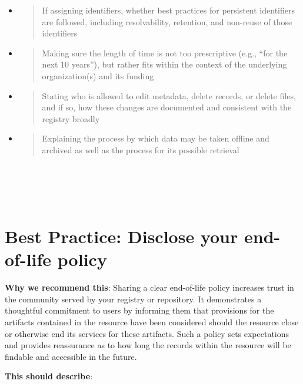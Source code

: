 \documentclass[]{article}
\begin{document}
\begin{itemize}
\item
  \begin{quote}
  If assigning identifiers, whether best practices for persistent
  identifiers are followed, including resolvability, retention, and
  non-reuse of those identifiers
  \end{quote}
\item
  \begin{quote}
  Making sure the length of time is not too prescriptive (e.g., ``for
  the next 10 years''), but rather fits within the context of the
  underlying organization(s) and its funding
  \end{quote}
\item
  \begin{quote}
  Stating who is allowed to edit metadata, delete records, or delete
  files, and if so, how these changes are documented and consistent with
  the registry broadly
  \end{quote}
\item
  \begin{quote}
  Explaining the process by which data may be taken offline and archived
  as well as the process for its possible retrieval
  \end{quote}
\end{itemize}

\section{\texorpdfstring{\\
}{ }}\label{section-9}

\newpage
\section{Best Practice: Disclose your end-of-life
policy}\label{best-practice-disclose-your-end-of-life-policy}

\textbf{Why we recommend this}: Sharing a clear end-of-life policy
increases trust in the community served by your registry or repository.
It demonstrates a thoughtful commitment to users by informing them that
provisions for the artifacts contained in the resource have been
considered should the resource close or otherwise end its services for
these artifacts. Such a policy sets expectations and provides
reassurance as to how long the records within the resource will be
findable and accessible in the future.

\textbf{This should describe}:
\end{document}
